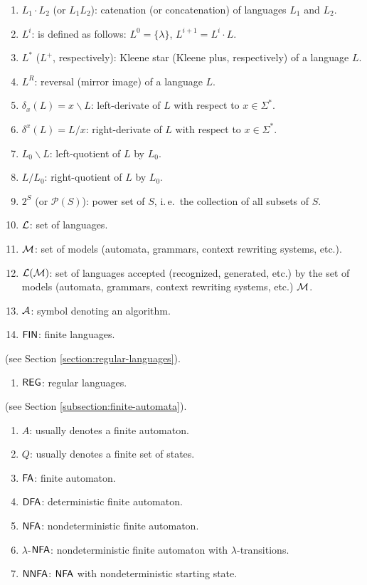 \begin{enumerate}[]
\item $L_1 \cdot L_2$ (or $L_1 L_2$): catenation (or concatenation) of languages $L_1$ and $L_2$.
\item $L^i$: is defined as follows: $L^0 = \{\lambda\}$, $L^{i+1} = L^i \cdot L$.
\item $L^*$ ($L^+$, respectively): Kleene star (Kleene plus, respectively) of a language $L$.
\item $L^R$: reversal (mirror image) of a language $L$.
\item $\delta_x(L) = x \backslash L$: left-derivate of $L$ with respect to $x \in \Sigma^*$.
\item $\delta^x(L) = L / x$: right-derivate of $L$ with respect to $x \in \Sigma^*$.
\item $L_0 \backslash L$: left-quotient of $L$ by $L_0$.
\item $L / L_0$: right-quotient of $L$ by $L_0$.
\item $2^S$ (or $\mathcal{P}(S)$): power set of $S$, i.\,e.\ the collection of all subsets of $S$.
\item $\textup{\sf $\mathcal{L}$}$: set of languages.
\item $\textup{\sf $\mathcal{M}$}$: set of models (automata, grammars, context rewriting systems, etc.).
\item ${\cal L}(\textup{\sf $\mathcal{M}$})$: set of languages accepted (recognized, generated, etc.) by the set of models (automata, grammars, context rewriting systems, etc.) $\textup{\sf $\mathcal{M}$}$.
\item $\textup{\sf $\mathcal{A}$}$: symbol denoting an algorithm.
\item $\textup{\sf FIN}$: finite languages.
\end{enumerate}

 (see Section \ref{section:regular-languages}).

\begin{enumerate}[]
\item $\textup{\sf REG}$: regular languages.
\end{enumerate}

 (see Section \ref{subsection:finite-automata}).

\begin{enumerate}[]
\item $A$: usually denotes a finite automaton.
\item $Q$: usually denotes a finite set of states.
\item $\textup{\sf FA}$: finite automaton.
\item $\textup{\sf DFA}$: deterministic finite automaton.
\item $\textup{\sf NFA}$: nondeterministic finite automaton.
\item $\lambda$-$\textup{\sf NFA}$: nondeterministic finite automaton with $\lambda$-transitions.
\item $\textup{\sf NNFA}$: $\textup{\sf NFA}$ with nondeterministic starting state.
\end{enumerate}

